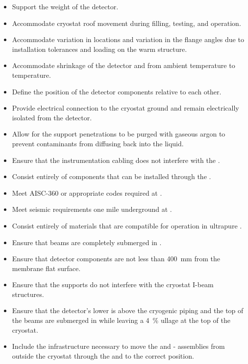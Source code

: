 \begin{itemize}
 \setlength\itemsep{1mm}
\setlength{\parsep}{1mm}
\setlength{\itemsep}{-5mm}
\item Support the weight of the detector.
\item Accommodate cryostat roof movement during filling, testing, and operation.
\item Accommodate variation in \fdth locations and
  variation in the flange angles due to installation tolerances and
  loading on the warm structure.
\item Accommodate shrinkage of the detector and  from ambient
  temperature to  temperature.
\item Define the position of the detector components relative to each other. 
\item Provide electrical connection to the cryostat ground and remain electrically isolated from the detector.
\item Allow for the support penetrations to be purged with gaseous argon to prevent contaminants from diffusing back into the liquid. 
\item Ensure that the instrumentation cabling does not interfere with the .
\item Consist entirely of components that can  
be installed through the .
\item %
Meet AISC-360 or appropriate codes required at \surf.
\item %
Meet seismic requirements one mile underground at \surf.
\item Consist entirely of %
materials that are compatible for operation in ultrapure .
\item Ensure that beams are completely submerged in .
\item Ensure that detector components are not less than \SI{400}{mm} from the membrane flat surface.
\item Ensure that the supports do not interfere with the cryostat I-beam structures.
\item Ensure %
that the detector's lower  is above the cryogenic piping and the top of the  beams are submerged in  while leaving a \SI{4}{\%} ullage at the top of the cryostat.
\item Include the infrastructure necessary to move the  and
  - assemblies from outside the cryostat through the
   and to the correct position.
\end{itemize}

